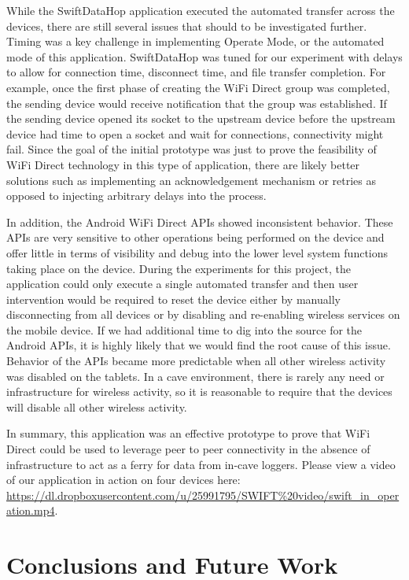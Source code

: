 \documentclass[10pt,twocolumn]{article}
\begin{document}
While the SwiftDataHop application executed the automated transfer across the devices, there are still several issues that should to be investigated further.
Timing was a key challenge in implementing Operate Mode, or the automated mode of this application.
SwiftDataHop was tuned for our experiment with delays to allow for connection time, disconnect time, and file transfer completion.
For example, once the first phase of creating the WiFi Direct group was completed, the sending device would receive notification that the group was established.  
If the sending device opened its socket to the upstream device before the upstream device had time to open a socket and wait for connections, connectivity might fail.
Since the goal of the initial prototype was just to prove the feasibility of WiFi Direct technology in this type of application, there are likely better solutions such as implementing an acknowledgement mechanism or retries as opposed to injecting arbitrary delays into the process. 

In addition, the Android WiFi Direct APIs showed inconsistent behavior.
These APIs are very sensitive to other operations being performed on the device and offer little in terms of visibility and debug into the lower level system functions taking place on the device.
During the experiments for this project, the application could only execute a single automated transfer and then user intervention would be required to reset the device either by manually disconnecting from all devices or by disabling and re-enabling wireless services on the mobile device.
If we had additional time to dig into the source for the Android APIs, it is highly likely that we would find the root cause of this issue.
Behavior of the APIs became more predictable when all other wireless activity was disabled on the tablets.
In a cave environment, there is rarely any need or infrastructure for wireless activity, so it is reasonable to require that the devices will disable all other wireless activity.

In summary, this application was an effective prototype to prove that WiFi Direct could be used to leverage peer to peer connectivity in the absence of infrastructure to act as a ferry for data from in-cave loggers.
Please view a video of our application in action on four devices here: \url{https://dl.dropboxusercontent.com/u/25991795/SWIFT%20video/swift_in_operation.mp4}.

\section{Conclusions and Future Work}
\end{document}
